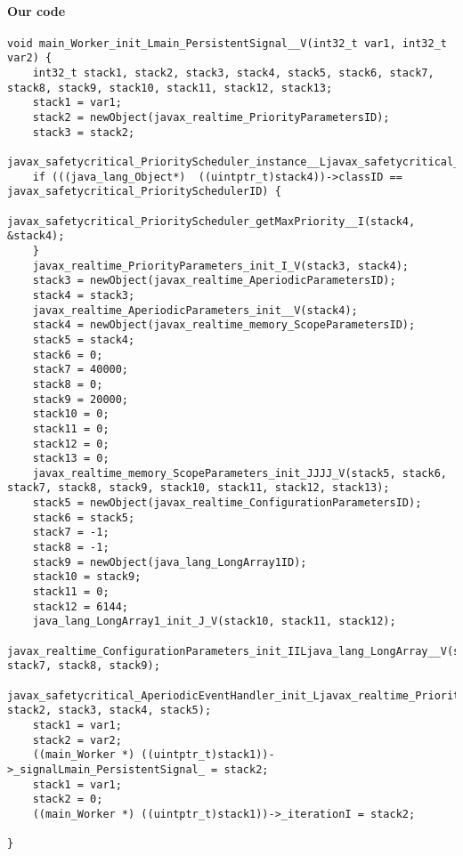 \paragraph{Our code}\hfill
\begin{lstlisting}[firstnumber=1574]
void main_Worker_init_Lmain_PersistentSignal__V(int32_t var1, int32_t var2) {
	int32_t stack1, stack2, stack3, stack4, stack5, stack6, stack7, stack8, stack9, stack10, stack11, stack12, stack13;
	stack1 = var1;
	stack2 = newObject(javax_realtime_PriorityParametersID);
	stack3 = stack2;
	javax_safetycritical_PriorityScheduler_instance__Ljavax_safetycritical_PriorityScheduler_(&stack4);
	if (((java_lang_Object*)  ((uintptr_t)stack4))->classID == javax_safetycritical_PrioritySchedulerID) {
		javax_safetycritical_PriorityScheduler_getMaxPriority__I(stack4, &stack4);
	}
	javax_realtime_PriorityParameters_init_I_V(stack3, stack4);
	stack3 = newObject(javax_realtime_AperiodicParametersID);
	stack4 = stack3;
	javax_realtime_AperiodicParameters_init__V(stack4);
	stack4 = newObject(javax_realtime_memory_ScopeParametersID);
	stack5 = stack4;
	stack6 = 0;
	stack7 = 40000;
	stack8 = 0;
	stack9 = 20000;
	stack10 = 0;
	stack11 = 0;
	stack12 = 0;
	stack13 = 0;
	javax_realtime_memory_ScopeParameters_init_JJJJ_V(stack5, stack6, stack7, stack8, stack9, stack10, stack11, stack12, stack13);
	stack5 = newObject(javax_realtime_ConfigurationParametersID);
	stack6 = stack5;
	stack7 = -1;
	stack8 = -1;
	stack9 = newObject(java_lang_LongArray1ID);
	stack10 = stack9;
	stack11 = 0;
	stack12 = 6144;
	java_lang_LongArray1_init_J_V(stack10, stack11, stack12);
	javax_realtime_ConfigurationParameters_init_IILjava_lang_LongArray__V(stack6, stack7, stack8, stack9);
	javax_safetycritical_AperiodicEventHandler_init_Ljavax_realtime_PriorityParameters_Ljavax_realtime_AperiodicParameters_Ljavax_realtime_memory_ScopeParameters_Ljavax_realtime_ConfigurationParameters__V(stack1, stack2, stack3, stack4, stack5);
	stack1 = var1;
	stack2 = var2;
	((main_Worker *) ((uintptr_t)stack1))->_signalLmain_PersistentSignal_ = stack2;
	stack1 = var1;
	stack2 = 0;
	((main_Worker *) ((uintptr_t)stack1))->_iterationI = stack2;

}
\end{lstlisting}


